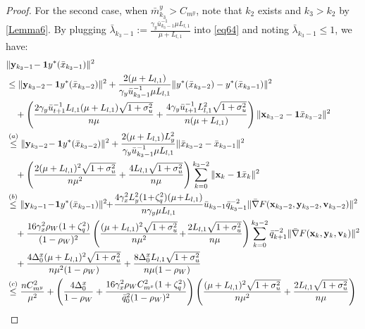 \documentclass{article}
\theoremstyle{plain}
\theoremstyle{definition}
\theoremstyle{remark}
\begin{document}
\begin{proof}
For the second case, when $\bar{m}^y_{k_3} > C_{m^y}$, note that $k_2$ exists and $k_3 > k_2$ by \cref{Lemma6}. By plugging $\bar{\lambda}_{k_3-1} := \frac{\gamma_y\bar{u}^{-1}_{k_3-1} \mu L_{l,1}}{\mu + L_{l,1}}$ into \cref{eq64} and noting $\bar{\lambda}_{k_3-1} \leq 1$, we have:
\begin{align}
&\|\mathbf{y}_{k_3-1}\!-\mathbf{1}y^*(\bar{x}_{k_3-1})\|^2 \notag\\
&\leq \|\mathbf{y}_{k_3-2}\!-\mathbf{1}y^*(\bar{x}_{k_3-2})\|^2 + \frac{2(\mu + L_{l,1})}{
\gamma_y\bar{u}^{-1}_{k_3-1} \mu L_{l,1}} \|y^*(\bar{x}_{k_3-2}) -y^*(\bar{x}_{k_3-1})\|^2 \notag \\
&\quad +  \left(\frac{2\gamma_y\bar{u}_{t+1}^{-1}L_{l,1}(\mu+L_{l,1})\sqrt{1+\sigma_u^2}}{n\mu }+\frac{4\gamma_y\bar{u}_{t+1}^{-1}L_{l,1}^2\sqrt{1+\sigma_u^2}}{n(\mu + L_{l,1})}\right) \|\mathbf{x}_{k_3-2}-\mathbf{1}\bar{x}_{k_3-2}\|^2\nonumber\\
&\overset{(a)}{\leq} \|\mathbf{y}_{k_3-2}\!-\mathbf{1}y^*(\bar{x}_{k_3-2})\|^2 +  \frac{2(\mu + L_{l,1})L_y^2}{\gamma_y\bar{u}^{-1}_{k_3-1} \mu L_{l,1}} \|\bar{x}_{k_3-2} - \bar{x}_{k_3-1}\|^2 \notag \\
&\quad +   \left(\frac{2(\mu+L_{l,1})^2\sqrt{1+\sigma_u^2}}{n\mu^2 }+\frac{4L_{l,1}\sqrt{1+\sigma_u^2}}{n\mu}\right)\sum_{k=0}^{k_3-2}\|\mathbf{x}_{k}-\mathbf{1}\bar{x}_{k}\|^2\nonumber\\
&\overset{(b)}{\leq}  \|\mathbf{y}_{k_2-1}\!-\!\mathbf{1}y^*(\bar{x}_{k_2-1})\|^2 \!\!+\! \frac{4\gamma_x^2L_y^2(1\!+\!\zeta_q^2)(\mu \!+\! L_{l,1})}{n\gamma_y \mu L_{l,1}}  \bar{u}_{k_3-1}
\bar{q}_{k_3-1}^{-2} \| \bar{\nabla} F(\mathbf{x}_{k_3-2},\mathbf{y}_{k_3-2},\mathbf{v}_{k_3-2})\|^2 \notag \\
&\quad + \frac{16 \gamma_x^2 \rho_W (1 + \zeta_q^2)}{(1 - \rho_W)^2} \left(\frac{(\mu+L_{l,1})^2\sqrt{1+\sigma_u^2}}{n\mu^2 }\!+\!\frac{2L_{l,1}\sqrt{1+\sigma_u^2}}{n\mu }\right)\sum_{k=0}^{k_3-2} 
 \bar{q}_{k+1}^{-2} \|\bar{\nabla}F(\mathbf{x}_k, \mathbf{y}_k, \mathbf{v}_k)\|^2\nonumber\\
&\quad + \frac{4\Delta_0^x(\mu+L_{l,1})^2\sqrt{1+\sigma_u^2}}{n\mu^2(1-\rho_W) }+\frac{8\Delta_0^xL_{l,1}\sqrt{1+\sigma_u^2}}{n\mu(1-\rho_W) }\nonumber\\
&\overset{(c)}{\leq}\frac{nC_{m^y}^2}{\mu^2}+\left(\frac{4\Delta_0^x}{1-\rho_W}+\frac{16 \gamma_x^2 \rho_WC_{m^x}^2 (1 + \zeta_q^2)}{\bar{q}_0^2(1 - \rho_W)^2} \right)\left(\frac{(\mu+L_{l,1})^2\sqrt{1+\sigma_u^2}}{n\mu^2 }+\frac{2L_{l,1}\sqrt{1+\sigma_u^2}}{n\mu }\right)\notag \\

\end{align}
\end{proof}
\end{document}
